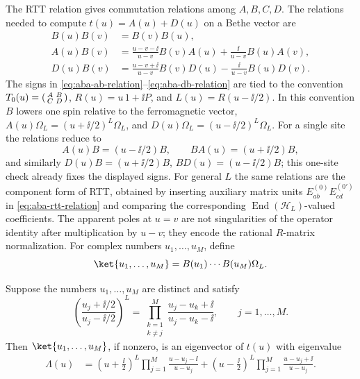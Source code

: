 The RTT relation gives commutation relations among \(A,B,C,D\).  The relations
needed to compute \(t(u)=A(u)+D(u)\) on a Bethe vector are
\begin{align}
  B(u)B(v)&=B(v)B(u),
  \label{eq:aba-bb-commutes}\\
  A(u)B(v)
  &=
  \frac{u-v-\ii}{u-v}B(v)A(u)
  +
  \frac{\ii}{u-v}B(u)A(v),
  \label{eq:aba-ab-relation}\\
  D(u)B(v)
  &=
  \frac{u-v+\ii}{u-v}B(v)D(u)
  -
  \frac{\ii}{u-v}B(u)D(v).
  \label{eq:aba-db-relation}
\end{align}
The signs in \eqref{eq:aba-ab-relation}--\eqref{eq:aba-db-relation} are tied
to the convention \(T_0(u)=\begin{psmallmatrix}A&B\\ C&D\end{psmallmatrix}\),
\(R(u)=u\,1+\ii P\), and \(L(u)=R(u-\ii/2)\).  In this convention \(B\) lowers
one spin relative to the ferromagnetic vector, \(A(u)\Omega_L=(u+\ii/2)^L
\Omega_L\), and \(D(u)\Omega_L=(u-\ii/2)^L\Omega_L\).  For a single site the
relations reduce to
\[
  A(u)B=(u-\ii/2)B,\qquad
  BA(u)=(u+\ii/2)B,
\]
and similarly \(D(u)B=(u+\ii/2)B\), \(BD(u)=(u-\ii/2)B\); this one-site check
already fixes the displayed signs.  For general \(L\) the same relations are
the component form of RTT, obtained by inserting auxiliary matrix units
\(E_{ab}^{(0)}E_{cd}^{(0')}\) in
\eqref{eq:aba-rtt-relation} and comparing the corresponding
\(\operatorname{End}(\mathcal H_L)\)-valued coefficients.  The apparent poles
at \(u=v\) are not singularities of the operator identity after multiplication
by \(u-v\); they encode the rational \(R\)-matrix normalization.
For complex numbers \(u_1,\ldots,u_M\), define
\[
  \ket{u_1,\ldots,u_M}
  =
  B(u_1)\cdots B(u_M)\Omega_L .
\]

\begin{theorem}
\label{thm:aba-xxx-bethe}
Suppose the numbers \(u_1,\ldots,u_M\) are distinct and satisfy
\begin{equation}
  \left(
    \frac{u_j+\ii/2}{u_j-\ii/2}
  \right)^L
  =
  \prod_{\substack{k=1\\ k\neq j}}^M
  \frac{u_j-u_k+\ii}{u_j-u_k-\ii},
  \qquad j=1,\ldots,M .
  \label{eq:aba-xxx-bethe-equations}
\end{equation}
Then \(\ket{u_1,\ldots,u_M}\), if nonzero, is an eigenvector of \(t(u)\) with
eigenvalue
\begin{equation}
\begin{aligned}
  \Lambda(u)
  &=
  \left(u+\frac{\ii}{2}\right)^L
  \prod_{j=1}^M\frac{u-u_j-\ii}{u-u_j}
  +
  \left(u-\frac{\ii}{2}\right)^L
  \prod_{j=1}^M\frac{u-u_j+\ii}{u-u_j}.
\end{aligned}
  \label{eq:aba-xxx-transfer-eigenvalue}
\end{equation}
\end{theorem}

